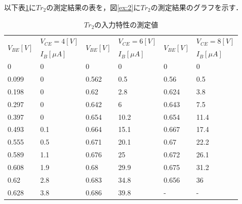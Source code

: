 \documentclass[10pt, a4j, dvipdfmx]{jarticle}
\begin{document}
    \newpage
    以下表\ref{tbl:2}に$Tr_2$の測定結果の表を，図\ref{ex:2}に$Tr_2$の測定結果のグラフを示す．
    \begin{table}[H]
        \centering
        \caption{$Tr_2$の入力特性の測定値}
        \label{tbl:2}
        \small
        \begin{tabular}{|l|l|l|l|l|l|}
        \hline
        \multirow{2}{*}{$V_{BE}[V]$} & $V_{CE}=4[V]$ & \multirow{2}{*}{$V_{BE}[V]$} & $V_{CE}=6[V]$ & \multirow{2}{*}{$V_{BE}[V]$} & $V_{CE}=8[V]$ \\ \cline{2-2} \cline{4-4} \cline{6-6} 
                                & $I_B[\mu A]$   &                         & $I_B[\mu A]$   &                         & $I_B[\mu A]$   \\ \hline
        0                       & 0        & 0                       & 0        & 0                       & 0        \\ \hline
        0.099                   & 0        & 0.562                   & 0.5      & 0.56                    & 0.5      \\ \hline
        0.198                   & 0        & 0.62                    & 2.8      & 0.624                   & 3.8      \\ \hline
        0.297                   & 0        & 0.642                   & 6        & 0.643                   & 7.5      \\ \hline
        0.397                   & 0        & 0.654                   & 10.2     & 0.654                   & 11.4     \\ \hline
        0.493                   & 0.1      & 0.664                   & 15.1     & 0.667                   & 17.4     \\ \hline
        0.555                   & 0.5      & 0.671                   & 20.1     & 0.67                    & 22.2     \\ \hline
        0.589                   & 1.1      & 0.676                   & 25       & 0.672                   & 26.1     \\ \hline
        0.608                   & 1.9      & 0.68                    & 29.9     & 0.675                   & 31.2     \\ \hline
        0.62                    & 2.8      & 0.683                   & 34.8     & 0.656                   & 36       \\ \hline
        0.628                   & 3.8      & 0.686                   & 39.8     & -                       & -        \\ \hline

\end{tabular}
\end{table}
\end{document}
